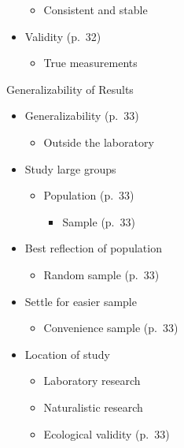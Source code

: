 \documentclass[
]{book}
\providecommand{\tightlist}{%
  \setlength{\itemsep}{0pt}\setlength{\parskip}{0pt}}
\begin{document}
\begin{reflect}
\begin{itemize}
  \begin{itemize}
  \tightlist
  \item
    Consistent and stable\\
  \end{itemize}
\item
  Validity (p.~32)

  \begin{itemize}
  \tightlist
  \item
    True measurements
  \end{itemize}
\end{itemize}

Generalizability of Results

\begin{itemize}
\tightlist
\item
  Generalizability (p.~33)

  \begin{itemize}
  \tightlist
  \item
    Outside the laboratory\\
  \end{itemize}
\item
  Study large groups

  \begin{itemize}
  \tightlist
  \item
    Population (p.~33)

    \begin{itemize}
    \tightlist
    \item
      Sample (p.~33)\\
    \end{itemize}
  \end{itemize}
\item
  Best reflection of population

  \begin{itemize}
  \tightlist
  \item
    Random sample (p.~33)\\
  \end{itemize}
\item
  Settle for easier sample

  \begin{itemize}
  \tightlist
  \item
    Convenience sample (p.~33)\\
  \end{itemize}
\item
  Location of study

  \begin{itemize}
  \tightlist
  \item
    Laboratory research\\
  \item
    Naturalistic research\\
  \item
    Ecological validity (p.~33)
  \end{itemize}
\end{itemize}


\end{reflect}
\end{document}
